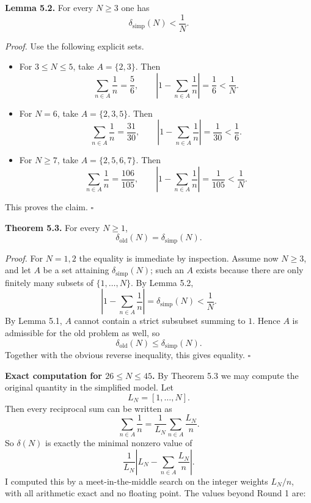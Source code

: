 \medskip
\textbf{Lemma 5.2.}
For every $N\ge 3$ one has
\[
\delta_{\mathrm{simp}}(N)<\frac1N.
\]

\emph{Proof.}
Use the following explicit sets.

\begin{itemize}
\item For $3\le N\le 5$, take $A=\{2,3\}$. Then
\[
\sum_{n\in A}\frac1n=\frac56,
\qquad
\left|1-\sum_{n\in A}\frac1n\right|=\frac16<\frac1N.
\]
\item For $N=6$, take $A=\{2,3,5\}$. Then
\[
\sum_{n\in A}\frac1n=\frac{31}{30},
\qquad
\left|1-\sum_{n\in A}\frac1n\right|=\frac1{30}<\frac16.
\]
\item For $N\ge 7$, take $A=\{2,5,6,7\}$. Then
\[
\sum_{n\in A}\frac1n=\frac{106}{105},
\qquad
\left|1-\sum_{n\in A}\frac1n\right|=\frac1{105}<\frac1N.
\]
\end{itemize}
This proves the claim. \hfill $\square$

\medskip
\textbf{Theorem 5.3.}
For every $N\ge 1$,
\[
\delta_{\mathrm{old}}(N)=\delta_{\mathrm{simp}}(N).
\]

\emph{Proof.}
For $N=1,2$ the equality is immediate by inspection. Assume now $N\ge 3$, and let $A$ be a set attaining $\delta_{\mathrm{simp}}(N)$; such an $A$ exists because there are only finitely many subsets of $\{1,\ldots,N\}$.
By Lemma 5.2,
\[
\left|1-\sum_{n\in A}\frac1n\right|=\delta_{\mathrm{simp}}(N)<\frac1N.
\]
By Lemma 5.1, $A$ cannot contain a strict subsubset summing to $1$. Hence $A$ is admissible for the old problem as well, so
\[
\delta_{\mathrm{old}}(N)\le \delta_{\mathrm{simp}}(N).
\]
Together with the obvious reverse inequality, this gives equality. \hfill $\square$

\medskip
\textbf{Exact computation for $26\le N\le 45$.}
By Theorem 5.3 we may compute the original quantity in the simplified model. Let
\[
L_N=[1,\ldots,N].
\]
Then every reciprocal sum can be written as
\[
\sum_{n\in A}\frac1n = \frac{1}{L_N}\sum_{n\in A}\frac{L_N}{n}.
\]
So $\delta(N)$ is exactly the minimal nonzero value of
\[
\frac{1}{L_N}\left|L_N-\sum_{n\in A}\frac{L_N}{n}\right|.
\]
I computed this by a meet-in-the-middle search on the integer weights $L_N/n$, with all arithmetic exact and no floating point. The values beyond Round 1 are:

